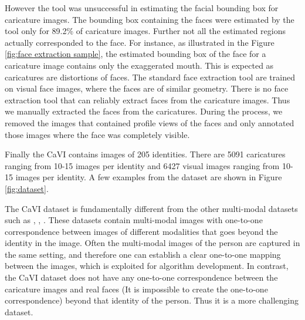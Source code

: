 However the tool was unsuccessful in estimating the facial bounding box for caricature images. The bounding box containing the faces were estimated by the tool only for 89.2\% of caricature images. Further not all the estimated regions actually corresponded to the face. For instance, as illustrated in the Figure \ref{fig:face extraction sample}, the estimated bounding box of the face for a caricature image contains only the exaggerated mouth. This is expected as caricatures are distortions of faces. The standard face extraction tool are trained on visual face images, where the faces are of similar geometry. There is no face extraction tool that can reliably extract faces from the caricature images. Thus we manually extracted the faces from the caricatures. During the process, we removed the images that contained profile views of the faces and only annotated those images where the face was completely visible.

Finally the CaVI contains images of 205 identities. There are 5091 caricatures ranging from 10-15 images per identity and 6427 visual images ranging from 10-15 images per identity. A few examples from the dataset are shown in Figure \ref{fig:dataset}. 





The CaVI dataset is fundamentally different from the other multi-modal datasets such as \cite{rw3}, \cite{rw1}, \cite{Facenet}. These datasets contain multi-modal images with one-to-one correspondence between images of different modalities that goes beyond the identity in the image. Often the multi-modal images of the person are captured in the same setting, and therefore one can establish a clear one-to-one mapping between the images, which is exploited for algorithm development. In contrast, the CaVI dataset does not have any one-to-one correspondence between the caricature images and real faces (It is impossible to create the one-to-one correspondence) beyond that identity of the person. Thus it is a more challenging dataset.


